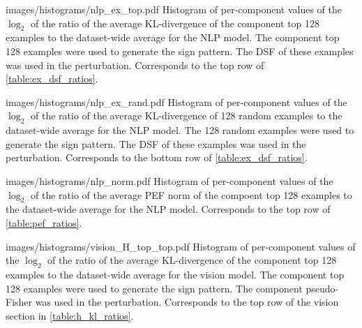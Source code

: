 \documentclass[dvipsnames]{article}
\begin{document}

\appendixhistogram
{images/histograms/nlp_ex_top.pdf}
{Histogram of per-component values of the $\log_2$ of the ratio of the average KL-divergence of the component top 128 examples to the dataset-wide average for the NLP model.
The component top 128 examples were used to generate the sign pattern.
The DSF of these examples was used in the perturbation.
Corresponds to the top row of \cref{table:ex_dsf_ratios}.}

\appendixhistogram
{images/histograms/nlp_ex_rand.pdf}
{Histogram of per-component values of the $\log_2$ of the ratio of the average KL-divergence of 128 random examples to the dataset-wide average for the NLP model.
The 128 random examples were used to generate the sign pattern.
The DSF of these examples was used in the perturbation.
Corresponds to the bottom row of \cref{table:ex_dsf_ratios}.}



\appendixhistogram
{images/histograms/nlp_norm.pdf}
{Histogram of per-component values of the $\log_2$ of the ratio of the average PEF norm of the compoent top 128 examples to the dataset-wide average for the NLP model.
Corresponds to the top row of \cref{table:pef_ratios}.}






\appendixhistogram
{images/histograms/vision_H_top_top.pdf}
{Histogram of per-component values of the $\log_2$ of the ratio of the average KL-divergence of the component top 128 examples to the dataset-wide average for the vision model.
The component top 128 examples were used to generate the sign pattern.
The component pseudo-Fisher was used in the perturbation.
Corresponds to the top row of the vision section in \cref{table:h_kl_ratios}.}
\end{document}
